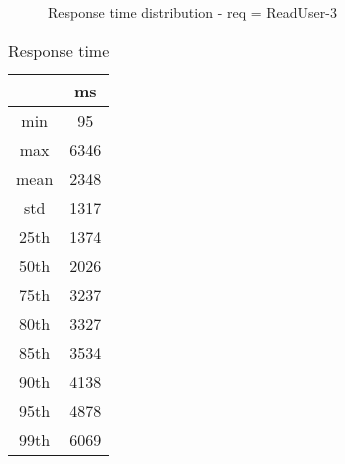 \begin{minipage}{0.75\linewidth}
\begin{figure}[h]
\begin{adjustbox}{max width=1.0\linewidth, keepaspectratio}
  \end{adjustbox}
  \caption{Response time distribution - req = ReadUser-3}
\end{figure}
\end{minipage}\hfill\begin{minipage}{0.18\linewidth}
\begin{table}[h]
\begin{tabular}{|cc|}
\hline
\textbf{} & \textbf{ms}\\ \hline
 \Xhline{0.005\arrayrulewidth}
min & 95\\
 \Xhline{0.005\arrayrulewidth}
max & 6346\\
 \Xhline{0.005\arrayrulewidth}
mean & 2348\\
 \Xhline{0.005\arrayrulewidth}
std & 1317\\
\hline
\hline
 \Xhline{0.005\arrayrulewidth}
25th & 1374\\
 \Xhline{0.005\arrayrulewidth}
50th & 2026\\
 \Xhline{0.005\arrayrulewidth}
75th & 3237\\
 \Xhline{0.005\arrayrulewidth}
80th & 3327\\
 \Xhline{0.005\arrayrulewidth}
85th & 3534\\
 \Xhline{0.005\arrayrulewidth}
90th & 4138\\
 \Xhline{0.005\arrayrulewidth}
95th & 4878\\
 \Xhline{0.005\arrayrulewidth}
99th & 6069\\
\hline
\end{tabular}
\caption{Response time}
\end{table}
\end{minipage}\hfill